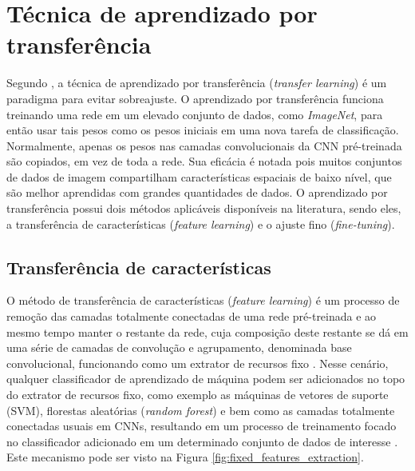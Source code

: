 \documentclass[
	12pt,				%
	oneside,			%
	a4paper,			%
	english,			%
	brazil				%
	]{abntex2ppgsi}
\begin{document}
\section{Técnica de aprendizado por transferência}
Segundo , a técnica de aprendizado por transferência (\textit{transfer learning}) é um paradigma para evitar sobreajuste. O aprendizado por transferência funciona treinando uma rede em um elevado conjunto de dados, como \textit{ImageNet}, para então usar tais pesos como os pesos iniciais em uma nova tarefa de classificação. Normalmente, apenas os pesos nas camadas convolucionais da CNN pré-treinada são copiados, em vez de toda a rede. Sua eficácia é notada pois muitos conjuntos de dados de imagem compartilham características espaciais de baixo nível, que são melhor aprendidas com grandes quantidades de dados. O aprendizado por transferência possui dois métodos aplicáveis disponíveis na literatura, sendo eles, a transferência de características (\textit{feature learning}) e o ajuste fino (\textit{fine-tuning}).

\subsection{Transferência de características}
O método de transferência de características (\textit{feature learning}) é um processo de remoção das camadas totalmente conectadas de uma rede pré-treinada e ao mesmo tempo manter o restante da rede, cuja composição deste restante se dá em uma série de camadas de convolução e agrupamento, denominada base convolucional, funcionando como um extrator de recursos fixo \cite{li2017learning}. Nesse cenário, qualquer classificador de aprendizado de máquina podem ser adicionados no topo do extrator de recursos fixo, como exemplo as máquinas de vetores de suporte (SVM), florestas aleatórias (\textit{random forest}) e bem como as camadas totalmente conectadas usuais em CNNs, resultando em um processo de treinamento focado no classificador adicionado em um determinado conjunto de dados de interesse \cite{li2017learning}. Este mecanismo pode ser visto na Figura \ref{fig:fixed_features_extraction}.
\end{document}
